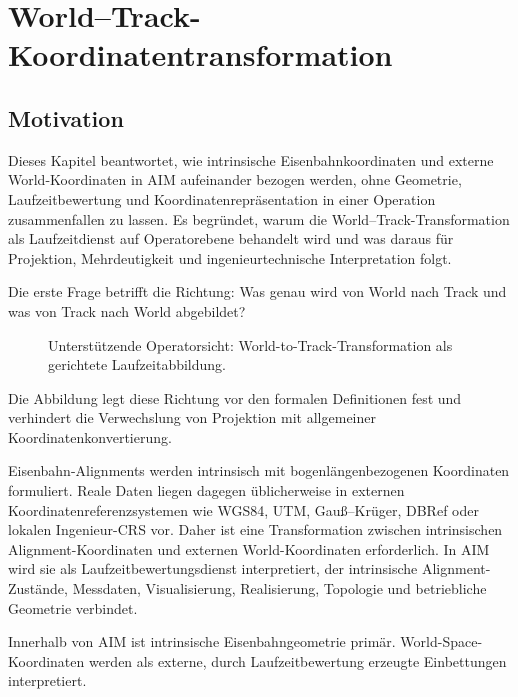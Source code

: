 
\chapter{World--Track-Koordinatentransformation}
\label{chap:world-to-track}

\section*{Motivation}

Dieses Kapitel beantwortet, wie intrinsische Eisenbahnkoordinaten und externe
World-Koordinaten in AIM aufeinander bezogen werden, ohne Geometrie,
Laufzeitbewertung und Koordinatenrepräsentation in einer Operation
zusammenfallen zu lassen. Es begründet, warum die World--Track-Transformation
als Laufzeitdienst auf Operatorebene behandelt wird und was daraus für
Projektion, Mehrdeutigkeit und ingenieurtechnische Interpretation folgt.

Die erste Frage betrifft die Richtung: Was genau wird von World nach Track und
was von Track nach World abgebildet?

\begin{figure}[htbp]
\centering

\caption{Unterstützende Operatorsicht: World-to-Track-Transformation als
gerichtete Laufzeitabbildung.}
\label{fig:world-to-track-transformation}
\end{figure}

Die Abbildung legt diese Richtung vor den formalen Definitionen fest und
verhindert die Verwechslung von Projektion mit allgemeiner
Koordinatenkonvertierung.

Eisenbahn-Alignments werden intrinsisch mit bogenlängenbezogenen Koordinaten
formuliert. Reale Daten liegen dagegen üblicherweise in externen
Koordinatenreferenzsystemen wie WGS84, UTM, Gauß--Krüger, DBRef oder lokalen
Ingenieur-CRS vor. Daher ist eine Transformation zwischen intrinsischen
Alignment-Koordinaten und externen World-Koordinaten erforderlich. In AIM
wird sie als Laufzeitbewertungsdienst interpretiert, der intrinsische
Alignment-Zustände, Messdaten, Visualisierung, Realisierung, Topologie und
betriebliche Geometrie verbindet.

\begin{principle}
\label{princ:intrinsic-space-primacy}
Innerhalb von AIM ist intrinsische Eisenbahngeometrie primär.
World-Space-Koordinaten werden als externe, durch Laufzeitbewertung erzeugte
Einbettungen interpretiert.
\end{principle}

